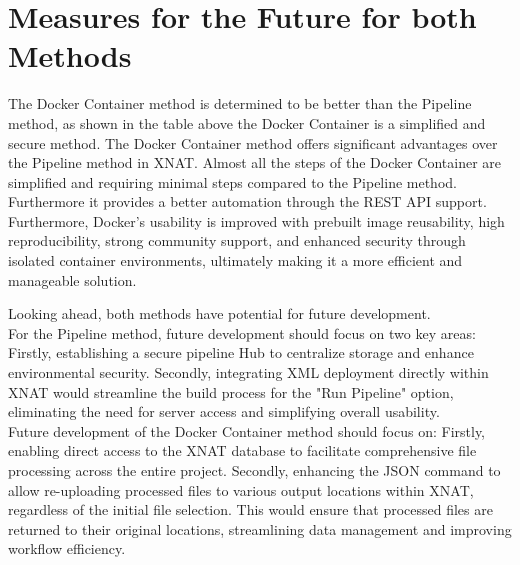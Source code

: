 \section{Measures for the Future for both Methods}

The Docker Container method is determined to be better than the Pipeline method, as shown in the table above the Docker Container is a simplified and secure method.  
The Docker Container method offers significant advantages over the Pipeline method in XNAT.
Almost all the steps of the Docker Container are simplified and requiring minimal steps compared to the Pipeline method. Furthermore it provides a better automation through the REST API support.  Furthermore, Docker's usability is improved with prebuilt image reusability, high reproducibility, strong community support, and enhanced security through isolated container environments, ultimately making it a more efficient and manageable solution.

Looking ahead, both methods have potential for future development.\\
For the Pipeline method, future development should focus on two key areas: Firstly, establishing a secure pipeline Hub to centralize storage and enhance environmental security. Secondly, integrating XML deployment directly within XNAT would streamline the build process for the "Run Pipeline" option, eliminating the need for server access and simplifying overall usability.\\
Future development of the Docker Container method should focus on: Firstly, enabling direct access to the XNAT database to facilitate comprehensive file processing across the entire project. Secondly, enhancing the JSON command to allow re-uploading processed files to various output locations within XNAT, regardless of the initial file selection. This would ensure that processed files are returned to their original locations, streamlining data management and improving workflow efficiency.
